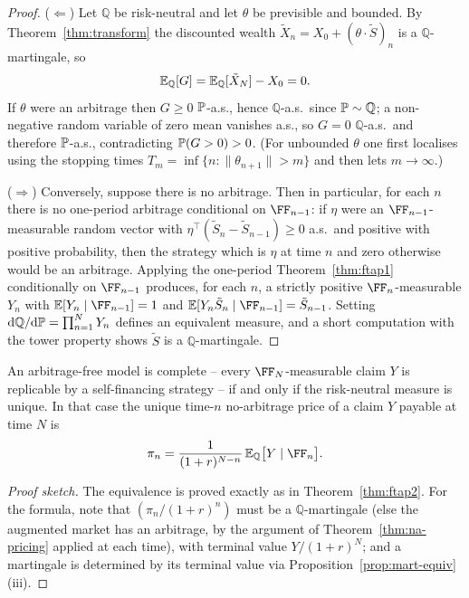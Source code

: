 \documentclass[a4paper]{scrartcl}
\newcommand{\QQ}{\mathbb{Q}}
\newcommand{\dP}{\mathrm{d}\PP}
\newcommand{\dQ}{\mathrm{d}\QQ}
\begin{document}
\begin{proof}
	($\Leftarrow$) Let $\QQ$ be risk-neutral and let $\theta$ be previsible and bounded. By Theorem~\ref{thm:transform} the discounted wealth $\tilde X_n = X_0 + (\theta\cdot\tilde S)_n$ is a $\QQ$-martingale, so
	$$
	\EE_\QQ[G] = \EE_\QQ[\tilde X_N] - X_0 = 0.
	$$
	If $\theta$ were an arbitrage then $G \geq 0$ $\mathbb{P}$-a.s., hence $\QQ$-a.s.\ since $\PP\sim\QQ$; a non-negative random variable of zero mean vanishes a.s., so $G = 0$ $\QQ$-a.s.\ and therefore $\mathbb{P}$-a.s., contradicting $\mathbb{P}(G>0)>0$. (For unbounded $\theta$ one first localises using the stopping times $T_m = \inf\{n : \|\theta_{n+1}\|>m\}$ and then lets $m\to\infty$.)

	($\Rightarrow$) Conversely, suppose there is no arbitrage. Then in particular, for each $n$ there is no one-period arbitrage conditional on $\FF_{n-1}$: if $\eta$ were an $\FF_{n-1}$-measurable random vector with $\eta^\top(\tilde S_n - \tilde S_{n-1})\geq 0$ a.s.\ and positive with positive probability, then the strategy which is $\eta$ at time $n$ and zero otherwise would be an arbitrage. Applying the one-period Theorem~\ref{thm:ftap1} conditionally on $\FF_{n-1}$ produces, for each $n$, a strictly positive $\FF_n$-measurable $Y_n$ with $\EE[Y_n\mid\FF_{n-1}] = 1$ and $\EE[Y_n \tilde S_n \mid \FF_{n-1}] = \tilde S_{n-1}$. Setting $\dQ/\dP = \prod_{n=1}^N Y_n$ defines an equivalent measure, and a short computation with the tower property shows $\tilde S$ is a $\QQ$-martingale.
\end{proof}

\begin{theorem}
	An arbitrage-free model is complete -- every $\FF_N$-measurable claim $Y$ is replicable by a self-financing strategy -- if and only if the risk-neutral measure is unique. In that case the unique time-$n$ no-arbitrage price of a claim $Y$ payable at time $N$ is
	$$
	\pi_n = \frac{1}{(1+r)^{N-n}}\,\EE_\QQ\big[Y \mid \FF_n\big].
	$$
\end{theorem}

\begin{proof}[Proof sketch]
	The equivalence is proved exactly as in Theorem~\ref{thm:ftap2}. For the formula, note that $(\pi_n/(1+r)^n)$ must be a $\QQ$-martingale (else the augmented market has an arbitrage, by the argument of Theorem~\ref{thm:na-pricing} applied at each time), with terminal value $Y/(1+r)^N$; and a martingale is determined by its terminal value via Proposition~\ref{prop:mart-equiv}(iii).
\end{proof}
\end{document}
